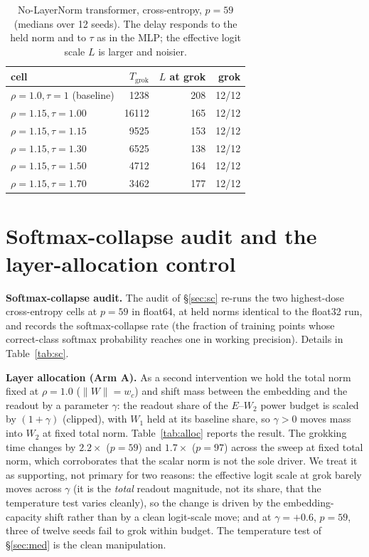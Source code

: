 \begin{table}[h]\centering\small
\caption{No-LayerNorm transformer, cross-entropy, $p=59$ (medians over 12 seeds). The delay responds to
the held norm and to $\tau$ as in the MLP; the effective logit scale $L$ is larger and noisier.}
\label{tab:tf}
\begin{tabular}{lrrr}
\toprule
cell & $T_{\mathrm{grok}}$ & $L$ at grok & grok \\
\midrule
$\rho{=}1.0,\tau{=}1$ (baseline) & 1238 & 208 & 12/12 \\
$\rho{=}1.15,\tau{=}1.00$ & 16112 & 165 & 12/12 \\
$\rho{=}1.15,\tau{=}1.15$ & 9525 & 153 & 12/12 \\
$\rho{=}1.15,\tau{=}1.30$ & 6525 & 138 & 12/12 \\
$\rho{=}1.15,\tau{=}1.50$ & 4712 & 164 & 12/12 \\
$\rho{=}1.15,\tau{=}1.70$ & 3462 & 177 & 12/12 \\
\bottomrule
\end{tabular}
\end{table}

\section{Softmax-collapse audit and the layer-allocation control}

\textbf{Softmax-collapse audit.} The audit of \S\ref{sec:sc} re-runs the two highest-dose cross-entropy
cells at $p=59$ in float64, at held norms identical to the float32 run, and records the softmax-collapse
rate (the fraction of training points whose correct-class softmax probability reaches one in working
precision). Details in Table~\ref{tab:sc}.

\textbf{Layer allocation (Arm A).} As a second intervention we hold the total norm fixed at $\rho=1.0$
($\|W\|=w_c$) and shift mass between the embedding and the readout by a parameter $\gamma$: the readout
share of the $E$--$W_2$ power budget is scaled by $(1+\gamma)$ (clipped), with $W_1$ held at its baseline
share, so $\gamma>0$ moves mass into $W_2$ at fixed total norm. Table~\ref{tab:alloc} reports the result.
The grokking time changes by $2.2\times$ ($p=59$) and $1.7\times$ ($p=97$) across the sweep at fixed total
norm, which corroborates that the scalar norm is not the sole driver. We treat it as supporting, not
primary for two reasons: the effective logit scale at grok barely moves across $\gamma$ (it is the
\emph{total} readout magnitude, not its share, that the temperature test varies cleanly), so the change is
driven by the embedding-capacity shift rather than by a clean logit-scale move; and at $\gamma=+0.6$,
$p=59$, three of twelve seeds fail to grok within budget. The temperature test of \S\ref{sec:med} is the
clean manipulation.

